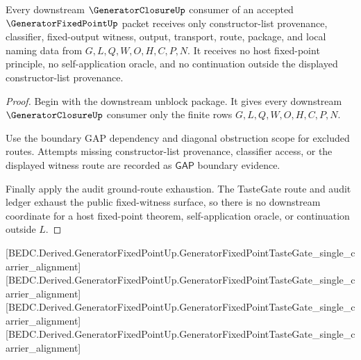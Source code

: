\begin{theorem}
\label{thm:generatorfixedpoint-downstream-nonescape-scope}
Every downstream $\GeneratorClosureUp$ consumer of an accepted $\GeneratorFixedPointUp$ packet receives only constructor-list provenance, classifier, fixed-output witness, output, transport, route, package, and local naming data from $G,L,Q,W,O,H,C,P,N$. It receives no host fixed-point principle, no self-application oracle, and no continuation outside the displayed constructor-list provenance.
\end{theorem}
\begin{proof}
Begin with the downstream unblock package. It gives every downstream $\GeneratorClosureUp$ consumer only the finite rows $G,L,Q,W,O,H,C,P,N$.

Use the boundary GAP dependency and diagonal obstruction scope for excluded routes. Attempts missing constructor-list provenance, classifier access, or the displayed witness route are recorded as $\mathsf{GAP}$ boundary evidence.

Finally apply the audit ground-route exhaustion. The TasteGate route and audit ledger exhaust the public fixed-witness surface, so there is no downstream coordinate for a host fixed-point theorem, self-application oracle, or continuation outside $L$.
\end{proof}

[BEDC.Derived.GeneratorFixedPointUp.GeneratorFixedPointTasteGate\_single\_carrier\_alignment]
[BEDC.Derived.GeneratorFixedPointUp.GeneratorFixedPointTasteGate\_single\_carrier\_alignment]
[BEDC.Derived.GeneratorFixedPointUp.GeneratorFixedPointTasteGate\_single\_carrier\_alignment]
[BEDC.Derived.GeneratorFixedPointUp.GeneratorFixedPointTasteGate\_single\_carrier\_alignment]

